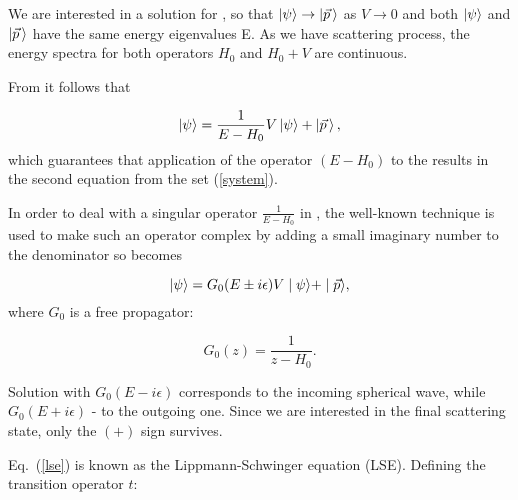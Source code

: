     We are interested in a solution for , so that 
    $\ket{\psi} \rightarrow \ket{\vec{p}\,}$ as $V \rightarrow 0$
    and both $\ket{\psi}$ and $\ket{\vec{p}\,}$ have the same energy eigenvalues E.
    As we have scattering process, the energy spectra for both operators $H_0$ and $H_0 + V$
    are continuous. 

    From  it follows that

    \begin{equation}
        \ket{\psi} = \frac{1}{E - H_0}V \ket{\psi} +  \ket{\vec{p}\,},
        \label{psieq}
    \end{equation}
    which guarantees that
     application of the operator $(E -H_0)$ to the 
     results in the second equation from the set (\ref{system}).


    In order to deal with a singular operator $\frac{1}{E - H_0}$ in , the well-known
    technique is used to make such an operator complex by adding a small imaginary number to the denominator
    so  becomes

    \begin{equation}
        \ket{\psi} = G_0(E \pm i\epsilon)V \mid \psi \rangle +  \mid \vec{p} \rangle,
        \label{lse}
    \end{equation}
    where $G_0$ is a free propagator:

    \begin{equation}
        G_0(z) = \frac{1}{z - H_0}.
        \label{g0}
    \end{equation}

    Solution with $G_0(E - i\epsilon)$ corresponds to the incoming spherical wave,
    while $G_0(E + i\epsilon)$ - to the outgoing one. Since we are interested in the final scattering
    state, only the $(+)$ sign survives.
    
    Eq.~(\ref{lse}) is known as the Lippmann-Schwinger equation (LSE).
    Defining the transition operator $t$:

